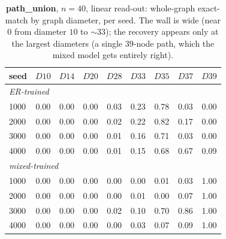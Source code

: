 \documentclass[11pt,a4paper]{article}
\begin{document}
\begin{table}[H]\centering\small
\begin{tabular}{lcccccccc}
\toprule
seed & $D10$ & $D14$ & $D20$ & $D28$ & $D33$ & $D35$ & $D37$ & $D39$ \\
\midrule
\multicolumn{9}{l}{\emph{ER-trained}}\\
1000 & 0.00 & 0.00 & 0.00 & 0.03 & 0.23 & 0.78 & 0.03 & 0.00 \\
2000 & 0.00 & 0.00 & 0.00 & 0.02 & 0.22 & 0.82 & 0.17 & 0.00 \\
3000 & 0.00 & 0.00 & 0.00 & 0.01 & 0.16 & 0.71 & 0.03 & 0.00 \\
4000 & 0.00 & 0.00 & 0.00 & 0.01 & 0.15 & 0.68 & 0.67 & 0.09 \\
\midrule
\multicolumn{9}{l}{\emph{mixed-trained}}\\
1000 & 0.00 & 0.00 & 0.00 & 0.00 & 0.00 & 0.01 & 0.03 & 1.00 \\
2000 & 0.00 & 0.00 & 0.00 & 0.00 & 0.01 & 0.00 & 0.07 & 1.00 \\
3000 & 0.00 & 0.00 & 0.00 & 0.02 & 0.10 & 0.70 & 0.86 & 1.00 \\
4000 & 0.00 & 0.00 & 0.00 & 0.00 & 0.03 & 0.07 & 0.09 & 1.00 \\
\bottomrule\end{tabular}
\caption{\textbf{path\_union}, $n=40$, linear read-out: whole-graph exact-match by graph diameter, per seed.
The wall is wide (near $0$ from diameter $10$ to $\sim33$); the recovery appears only at the
largest diameters (a single $39$-node path, which the mixed model gets entirely right).}
\label{tab:byd_pu_n40}
\end{table}
\end{document}

